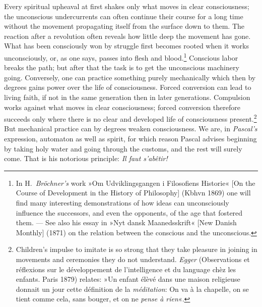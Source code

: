 \documentclass[12pt,a4paper]{book}
\newcommand{\opage}[1]{\marginnote{\footnotesize\textit{[#1]}}}
\begin{document}
Every spiritual upheaval at first shakes only what moves in clear
consciousness; the unconscious undercurrents can often continue their
course for a long time without the movement propagating itself from the
surface down to them. The reaction after a revolution often reveals how
little deep the movement has gone. What has been consciously won by
struggle first becomes rooted when it works unconsciously, or, as one
says, passes into flesh and blood.\footnote{In H.~\emph{Bröchner's}
work »Om Udviklingsgangen i Filosofiens Historie« [On the Course of
Development in the History of Philosophy] (Kbhvn 1869) one will find
many interesting demonstrations of how ideas can unconsciously influence
the successors, and even the opponents, of the age that fostered them.
--- See also his essay in »Nyt dansk Maanedsskrift« [New Danish Monthly]
(1871) on the relation between the conscious and the unconscious.}
Conscious labor breaks the path; but after that the task is to get the
unconscious machinery going. Conversely, one can practice something
purely mechanically which then by degrees gains power over the life of
consciousness. Forced conversion can lead to living faith, if not in the
same generation then in later generations. Compulsion works against what
moves in clear consciousness; forced conversion therefore succeeds only
where there is no clear and developed life of consciousness
present.\footnote{Children's impulse to imitate is so strong that they
take pleasure in joining in movements and ceremonies they do not
understand. \emph{Egger} (Observations et réflexions sur le développement
de l’intelligence et du language chèz les enfants. Paris 1879) relates:
»Un enfant élèvé dans une maison religieuse donnait un jour cette
définition de la \emph{méditation}: On va à la chapelle, on se tient
comme cela, sans bouger, et on ne \emph{pense à rien}«.} But mechanical
practice can by degrees weaken consciousness.
\opage{91}We are, in \emph{Pascal's} expression, automaton as well as
spirit, for which reason Pascal advises beginning by taking holy water
and going through the customs, and the rest will surely come. That is his
notorious principle: \textit{Il faut s’abêtir!}
\end{document}
